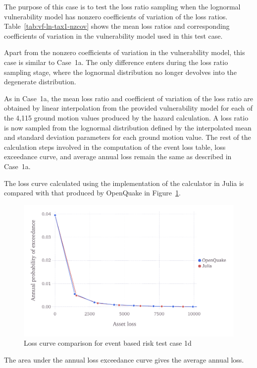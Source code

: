 The purpose of this case is to test the loss ratio sampling when the lognormal vulnerability model has nonzero coefficients of variation of the loss ratios. Table~\ref{tab:vf-ln-tax1-nzcov} shows the mean loss ratios and corresponding coefficients of variation in the vulnerability model used in this test case.

Apart from the nonzero coefficients of variation in the vulnerability model, this case is similar to Case~1a. The only difference enters during the loss ratio sampling stage, where the lognormal distribution no longer devolves into the degenerate distribution.

As in Case~1a, the mean loss ratio and coefficient of variation of the loss ratio are obtained by linear interpolation from the provided vulnerability model for each of the 4,115 ground motion values produced by the hazard calculation. A loss ratio is now sampled from the lognormal distribution defined by the interpolated mean and standard deviation parameters for each ground motion value. The rest of the calculation steps involved in the computation of the event loss table, loss exceedance curve, and average annual loss remain the same as described in Case~1a.

The loss curve calculated using the implementation of the calculator in Julia is compared with that produced by OpenQuake in Figure~\ref{fig:lc-ebr-1d}.

\begin{figure}[htbp]
\centering
\includegraphics[width=12cm]{qareport/figures/fig-lc-ebr-1d}
\caption{Loss curve comparison for event based risk test case 1d}
\label{fig:lc-ebr-1d}
\end{figure}

The area under the annual loss exceedance curve gives the average annual loss.